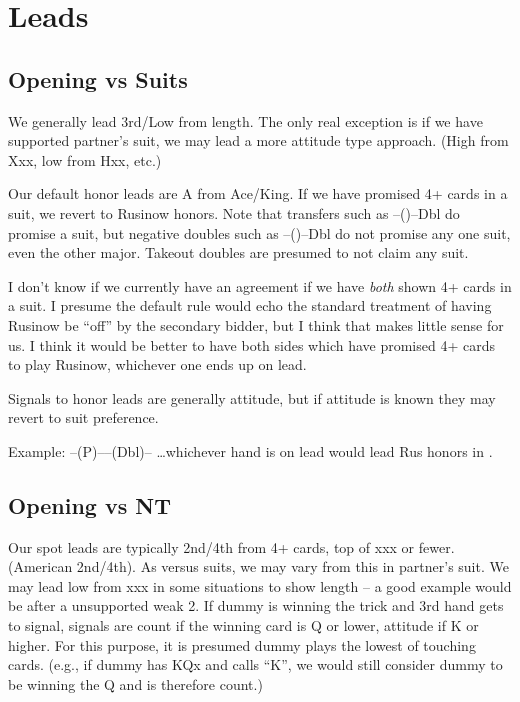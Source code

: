 \documentclass[tom-ari]{subfiles}
\begin{document}
\chapter{Leads}

\section{Opening vs Suits}

We generally lead 3rd/Low from length.  The only real exception is if we have supported partner's suit, we may lead a more attitude type approach. (High from Xxx, low from Hxx, etc.)

Our default honor leads are A from Ace/King. If we have promised 4+ cards in a suit, we revert to Rusinow honors. Note that transfers such as --()--Dbl do promise a suit, but negative doubles such as --()--Dbl do not promise any one suit, even the other major.  Takeout doubles are presumed to not claim any suit.

 I don't know if we currently have an agreement if we have \textit{both} shown 4+ cards in a suit. I presume the default rule would echo the standard treatment of having Rusinow be ``off'' by the secondary bidder, but I think that makes little sense for us.  I think it would be better to have both sides which have promised 4+ cards to play Rusinow, whichever one ends up on lead.

Signals to honor leads are generally attitude, but if attitude is known they may revert to suit preference.

Example: --(P)----(Dbl)-- \ldots whichever hand is on lead would lead Rus honors in \heartsuit. 

\section{Opening vs NT}

Our spot leads are typically 2nd/4th from 4+ cards, top of xxx or fewer. (American 2nd/4th).  As versus suits, we may vary from this in partner's suit. We may lead low from xxx in some situations to show length -- a good example would be after a unsupported weak 2. If dummy is winning the trick and 3rd hand gets to signal, signals are count if the winning card is Q or lower, attitude if K or higher. For this purpose, it is presumed dummy plays the lowest of touching cards.  (e.g., if dummy has KQx and calls ``K'', we would still consider dummy to be winning the Q and is therefore count.)
\end{document}
